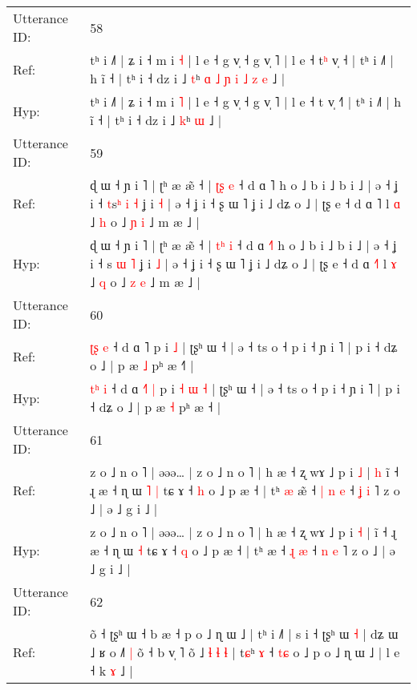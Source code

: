 \documentclass[10pt]{article}
\DeclareRobustCommand{\hl}[1]{{\textcolor{red}{#1}}}
\begin{document}
\begin{longtable}{ll}
 \\
\midrule
Utterance ID: & 58 \\
Ref: & tʰ i ˩˥ | ʑ i ˧ m i \hl{˧} | l e ˧ g v̩ ˧ g v̩ ˥ | l e ˧ t\hl{ʰ} v̩ ˧\hl{} | tʰ i ˩˥ | h ĩ ˧ | tʰ i ˧ dz i ˩ \hl{t}ʰ\hl{ }\hl{ɑ}\hl{ }\hl{˩}\hl{ }\hl{ɲ}\hl{ }\hl{i}\hl{ }\hl{˩}\hl{ }\hl{z} \hl{e} ˩ |
 \\
Hyp: & tʰ i ˩˥ | ʑ i ˧ m i \hl{˥} | l e ˧ g v̩ ˧ g v̩ ˥ | l e ˧ t\hl{} v̩ ˧\hl{˥} | tʰ i ˩˥ | h ĩ ˧ | tʰ i ˧ dz i ˩ \hl{k}ʰ\hl{}\hl{}\hl{}\hl{}\hl{}\hl{}\hl{}\hl{}\hl{}\hl{}\hl{}\hl{} \hl{ɯ} ˩ |
 \\
\midrule
Utterance ID: & 59 \\
Ref: & ɖ ɯ ˧ ɲ i ˥ | ʈʰ æ æ̃ ˧ | \hl{ʈ}\hl{ʂ} \hl{e} ˧ d ɑ \hl{}˥ h o ˩ b i ˩ b i ˩ | ə ˧ ʝ i ˧ \hl{t}s\hl{ʰ} \hl{i} \hl{˧} ʝ i \hl{˧} | ə ˧ ʝ i ˧ ʂ ɯ ˥ ʝ i ˩ dʑ o ˩ | ʈʂ e ˧ d ɑ \hl{}˥ l \hl{ɑ} ˩ \hl{h} o ˩ \hl{ɲ} \hl{i} ˩ m æ ˩ |
 \\
Hyp: & ɖ ɯ ˧ ɲ i ˥ | ʈʰ æ æ̃ ˧ | \hl{t}\hl{ʰ} \hl{i} ˧ d ɑ \hl{˧}˥ h o ˩ b i ˩ b i ˩ | ə ˧ ʝ i ˧ \hl{}s\hl{} \hl{ɯ} \hl{˥} ʝ i \hl{˩} | ə ˧ ʝ i ˧ ʂ ɯ ˥ ʝ i ˩ dʑ o ˩ | ʈʂ e ˧ d ɑ \hl{˧}˥ l \hl{ɤ} ˩ \hl{q} o ˩ \hl{z} \hl{e} ˩ m æ ˩ |
 \\
\midrule
Utterance ID: & 60 \\
Ref: & \hl{ʈ}\hl{ʂ} \hl{e} ˧ d ɑ \hl{}˥\hl{}\hl{} p i\hl{}\hl{}\hl{}\hl{} \hl{˩} | ʈʂʰ ɯ ˧ | ə ˧ ts o ˧ p i ˧ ɲ i ˥ | p i ˧ dʑ o ˩ | p æ \hl{˩} pʰ æ ˧\hl{˥} |
 \\
Hyp: & \hl{t}\hl{ʰ} \hl{i} ˧ d ɑ \hl{˧}˥\hl{ }\hl{|} p i\hl{ }\hl{˧}\hl{ }\hl{ɯ} \hl{˧} | ʈʂʰ ɯ ˧ | ə ˧ ts o ˧ p i ˧ ɲ i ˥ | p i ˧ dʑ o ˩ | p æ \hl{˧} pʰ æ ˧\hl{} |
 \\
\midrule
Utterance ID: & 61 \\
Ref: & z o ˩ n o ˥ | əəə… | z o ˩ n o ˥ | h æ ˧ ʐ wɤ ˩ p i \hl{˩} |\hl{ }\hl{h} ĩ ˧ ɻ æ ˧ ɳ ɯ\hl{ }\hl{˥} \hl{|} tɕ ɤ ˧ \hl{h} o ˩ p æ ˧ | tʰ\hl{ }\hl{æ} æ\hl{̃} ˧\hl{ }\hl{|} \hl{n} \hl{e} ˧ \hl{ʝ} \hl{i} ˥ z o ˩ | ə ˩ g i ˩ |
 \\
Hyp: & z o ˩ n o ˥ | əəə… | z o ˩ n o ˥ | h æ ˧ ʐ wɤ ˩ p i \hl{˧} |\hl{}\hl{} ĩ ˧ ɻ æ ˧ ɳ ɯ\hl{}\hl{} \hl{˧} tɕ ɤ ˧ \hl{q} o ˩ p æ ˧ | tʰ\hl{}\hl{} æ\hl{} ˧\hl{}\hl{} \hl{ɻ} \hl{æ} ˧ \hl{n} \hl{e} ˥ z o ˩ | ə ˩ g i ˩ |
 \\
\midrule
Utterance ID: & 62 \\
Ref: & õ ˧ ʈʂʰ ɯ ˧ b æ ˧ p o ˩ ɳ ɯ ˩ | tʰ i ˩˥ | s i ˧ ʈʂʰ ɯ \hl{˧} | dʑ ɯ ˩ ʁ\hl{}\hl{}\hl{} o ˩\hl{}\hl{˥} \hl{|} õ ˧ b v̩ ˥ õ ˩\hl{ }\hl{ɬ}\hl{ }\hl{ɬ}\hl{ }\hl{ɬ} | t\hl{ɕ}ʰ \hl{ɤ} ˧ \hl{t}\hl{ɕ} o ˩ p o ˩ ɳ ɯ ˩ | l e ˧ k \hl{ɤ} ˩ |

\end{longtable}
\end{document}

